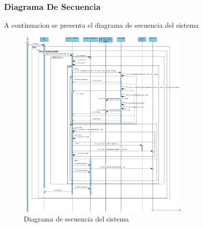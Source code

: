 \documentclass{article}
\begin{document}
		\subsubsection{Diagrama De Secuencia}
		A continuacion se presenta el diagrama de secuencia del sistema
		\begin{figure}[H]
			\centering
			\includegraphics[width=0.75\textwidth]{Diagrama_de_secuencia}
			\caption{Diagrama de secuencia del sistema}
			\label{fig:mesh3}
		\end{figure}
\end{document}
